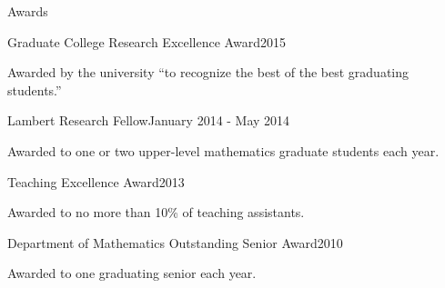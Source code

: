 \documentclass{resume} %
\begin{document}

\begin{rSection}{Awards}
\begin{rSubsection}{Graduate College Research Excellence Award}{2015}{}{}
	\item Awarded by the university ``to recognize the best of the best graduating students.''
\end{rSubsection}
 
\begin{rSubsection}{Lambert Research Fellow}{January 2014 - May 2014}{}{}
	\item Awarded to one or two upper-level mathematics graduate students each year.
\end{rSubsection} 

\begin{rSubsection}{Teaching Excellence Award}{2013}{}{}
	\item Awarded to no more than 10\% of teaching assistants.
\end{rSubsection}

\begin{rSubsection}{Department of Mathematics Outstanding Senior Award}{2010}{}{}
\item Awarded to one graduating senior each year.
\end{rSubsection}
\end{rSection}







\end{document}
